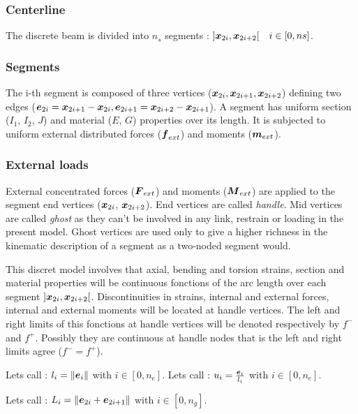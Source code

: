 \subsubsection{Centerline}

The discrete beam is divided into $n_s$ segments : $]\boldsymbol{x}_{2i},  \boldsymbol{x}_{2i+2}[ \quad i \in [0,ns] $.

\subsubsection{Segments}

The i-th segment is composed of three vertices ($\boldsymbol{x}_{2i}, \boldsymbol{x}_{2i+1},  \boldsymbol{x}_{2i+2}$) defining two edges ($\boldsymbol{e}_{2i} = \boldsymbol{x}_{2i+1} - \boldsymbol{x}_{2i}, \boldsymbol{e}_{2i+1} = \boldsymbol{x}_{2i+2} - \boldsymbol{x}_{2i+1}$).
A segment has uniform section ($I_1$, $I_2$, $J$) and material ($E$, $G$) properties over its length.
It is subjected to uniform external distributed forces ($\boldsymbol{f}_{ext}$) and moments ($\boldsymbol{m}_{ext}$).

\subsubsection{External loads}

External concentrated forces ($\boldsymbol{F}_{ext}$) and moments ($\boldsymbol{M}_{ext}$) are applied to the segment end vertices ($\boldsymbol{x}_{2i}$,  $\boldsymbol{x}_{2i+2}$).
End vertices are called \emph{handle}. Mid vertices are called \emph{ghost} as they can't be involved in any link, restrain or loading in the present model. Ghost vertices are used only to give a higher richness in the kinematic description of a segment as a two-noded segment would.

This discret model involves that axial, bending and torsion strains, section and material properties will be continuous fonctions of the arc length over each segment $]\boldsymbol{x}_{2i},  \boldsymbol{x}_{2i+2}[$. Discontinuities in strains, internal and external forces, internal and external moments will be located at handle vertices. The left and right limits of this fonctions at handle vertices will be denoted respectively by $f^-$ and $f^+$. Possibly they are continuous at handle nodes that is the left and right limits agree ($f^- = f^+$).

Lets call : $l_i = \lVert\boldsymbol{e}_{i}\rVert$ with $i \in [0,n_e]$.
Lets call : $u_i = \frac{\boldsymbol{e}_{i}}{l_i}$ with $i \in [0,n_e]$.


Lets call : $L_i = \lVert\boldsymbol{e}_{2i} + \boldsymbol{e}_{2i+1}\rVert$ with $i \in [0,n_g]$.

